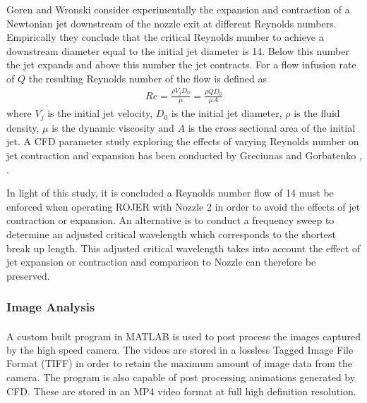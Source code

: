 \documentclass[11pt]{article}
\begin{document}
Goren and Wronski \cite{goren1966shape} consider experimentally the expansion and contraction of a Newtonian jet downstream of the nozzle exit at different Reynolds numbers. Empirically they conclude that the critical Reynolds number to achieve a downstream diameter equal to the initial jet diameter is 14. Below this number the jet expands and above this number the jet contracts. For a flow infusion rate of $Q$ the resulting Reynolds number of the flow is defined as
\begin{align*}
Re = \frac{\rho V_j D_0 }{\mu} = \frac{\rho Q D_0 }{\mu A }
\end{align*}
where $V_j$ is the initial jet velocity, $D_0$ is the initial jet diameter, $\rho$ is the fluid density, $\mu$ is the dynamic viscosity and $A$ is the cross sectional area of the initial jet. A CFD parameter study exploring the effects of varying Reynolds number on jet contraction and expansion has been conducted by Greciunas and Gorbatenko \cite{greiciunas2015report}, \cite{gorbatenko2015report}.

In light of this study, it is concluded a Reynolds number flow of 14 must be enforced when operating ROJER with Nozzle 2 in order to avoid the effects of jet contraction or expansion. An alternative is to conduct a frequency sweep to determine an adjusted critical wavelength which corresponds to the shortest break up length. This adjusted critical wavelength takes into account the effect of jet expansion or contraction and comparison to Nozzle can therefore be preserved.

\subsubsection{Image Analysis} \label{sec:image_analysis}
A custom built program in MATLAB \textsuperscript{\textregistered} is used to post process the images captured by the high speed camera. The videos are stored in a lossless Tagged Image File Format (TIFF) in order to retain the maximum amount of image data from the camera. The program is also capable of post processing animations generated by CFD. These are stored in an MP4 video format at full high definition resolution.
\end{document}

